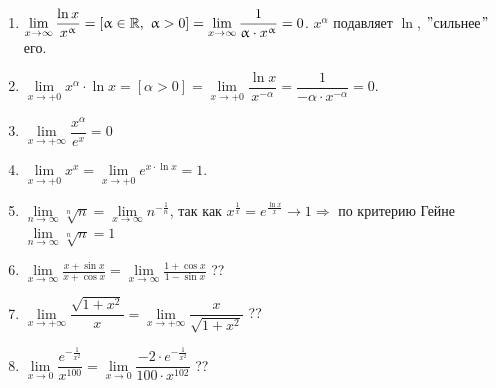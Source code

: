 	\begin{example}
		\begin{enumerate}
			\item $\lim\limits_{x \rightarrow \infty}\dfrac{\ln x}{x^\upalpha} = [\upalpha \in \mathbb{R},\ \upalpha > 0] = \lim\limits_{x \rightarrow \infty}\dfrac{1}{\upalpha \cdot x^\upalpha} = 0$.
			$x^\alpha$ подавляет $\ln$, $"$сильнее$"$ его.
			\item $\lim\limits_{x \rightarrow +0} x^\alpha \cdot \ln x = [\alpha > 0] = \lim\limits_{x \rightarrow +0}\dfrac{\ln x}{x^{-\alpha}} = \dfrac{1}{-\alpha \cdot x^{-\alpha}} = 0$.
			\item $\lim\limits_{x \rightarrow +\infty}\dfrac{x^\alpha}{e^x} = 0$
			\item $\lim\limits_{x \rightarrow +0} x^x = \lim\limits_{x \rightarrow +0} e^{x \cdot \ln x} = 1$.
			\item $\lim\limits_{n \rightarrow \infty} \sqrt[n]{n} = \lim\limits_{x \rightarrow \infty} n^{-\frac{1}{n}}$, так как $x^\frac{1}{x} = e^\frac{\ln x}{x} \rightarrow 1 \Rightarrow$ по критерию Гейне $\lim\limits_{n \rightarrow \infty} \sqrt[n]{n} = 1$
			\item $\lim\limits_{x \rightarrow \infty}\frac{x + \sin x}{x + \cos x} = \lim\limits_{x \rightarrow \infty}\frac{1 + \cos x}{1 - \sin x}$ ??
			\item $\lim\limits_{x \rightarrow +\infty}\dfrac{\sqrt{1+x^2}}{x} = \lim\limits_{x \rightarrow +\infty}\dfrac{x}{\sqrt{1+x^2}}$ ??
			\item $\lim\limits_{x \rightarrow 0}\dfrac{e^{-\frac{1}{x^2}}}{x^{100}} = \lim\limits_{x \rightarrow 0}\dfrac{-2\cdot e^{-\frac{1}{x^2}}}{100\cdot x^{102}}$ ??
		\end{enumerate}
	\end{example}    
